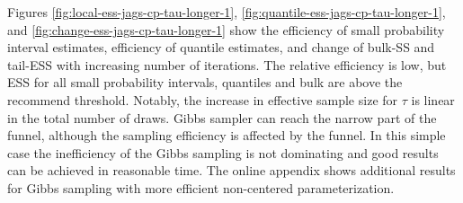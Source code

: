 \documentclass[american,]{article}
\theoremstyle{definition}
\begin{document}
Figures \ref{fig:local-ess-jags-cp-tau-longer-1},
\ref{fig:quantile-ess-jags-cp-tau-longer-1}, and
\ref{fig:change-ess-jags-cp-tau-longer-1} show the efficiency of small
probability interval estimates, efficiency of quantile estimates, and
change of bulk-SS and tail-ESS with increasing number of
iterations. The relative efficiency is low, but ESS for all small
probability intervals, quantiles and bulk are above the recommend
threshold. Notably, the increase in effective sample size for
$\tau$ is linear in the total number of draws.  Gibbs sampler can
reach the narrow part of the funnel, although the sampling efficiency
is affected by the funnel. In this simple case the inefficiency of the
Gibbs sampling is not dominating and good results can be achieved in
reasonable time. The online appendix shows additional results for Gibbs
sampling with more efficient non-centered parameterization.
\end{document}
